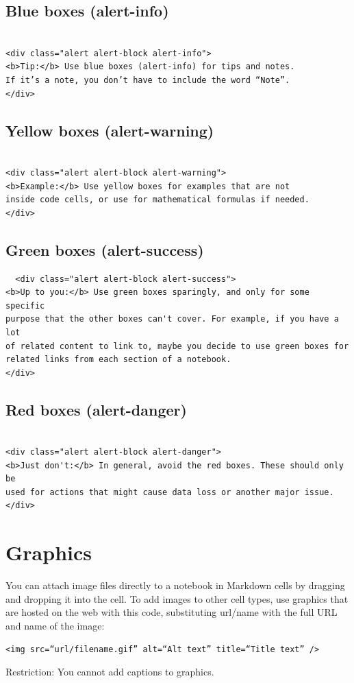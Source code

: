 \subsection{Blue boxes (alert-info)}
\begin{verbatim}
   
<div class="alert alert-block alert-info">
<b>Tip:</b> Use blue boxes (alert-info) for tips and notes. 
If it’s a note, you don’t have to include the word “Note”.
</div> 
\end{verbatim}
\subsection{Yellow boxes (alert-warning)}
\begin{verbatim}
   
<div class="alert alert-block alert-warning">
<b>Example:</b> Use yellow boxes for examples that are not 
inside code cells, or use for mathematical formulas if needed.
</div> 
\end{verbatim}


\subsection{Green boxes (alert-success)}
\begin{verbatim}
  <div class="alert alert-block alert-success">
<b>Up to you:</b> Use green boxes sparingly, and only for some specific 
purpose that the other boxes can't cover. For example, if you have a lot 
of related content to link to, maybe you decide to use green boxes for 
related links from each section of a notebook.
</div>  
\end{verbatim}

\subsection{Red boxes (alert-danger)}
\begin{verbatim}
    
<div class="alert alert-block alert-danger">
<b>Just don't:</b> In general, avoid the red boxes. These should only be
used for actions that might cause data loss or another major issue.
</div>
\end{verbatim}

\section{Graphics}
You can attach image files directly to a notebook in Markdown cells by dragging and dropping it into the cell.
To add images to other cell types, use graphics that are hosted on the web with this code, substituting url/name with the full URL and name of the image:
\begin{verbatim}
<img src=“url/filename.gif” alt=“Alt text” title=“Title text” />
\end{verbatim}
Restriction: You cannot add captions to graphics.
